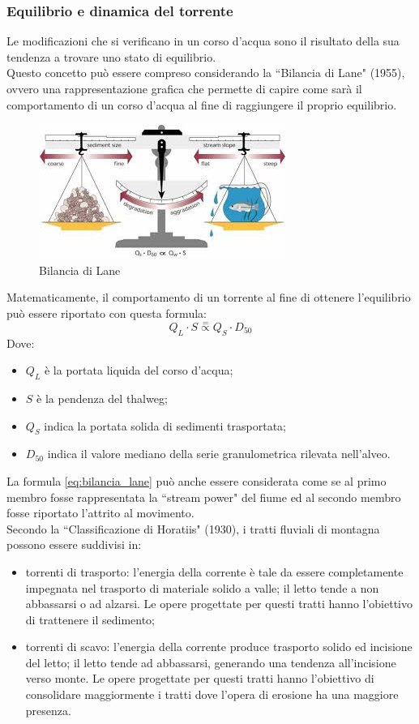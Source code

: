 \subsubsection{Equilibrio e dinamica del torrente}
Le modificazioni che si verificano in un corso d'acqua sono il risultato della sua tendenza a trovare uno stato di equilibrio.\\
Questo concetto può essere compreso considerando la ``Bilancia di Lane" (1955), ovvero una rappresentazione grafica che permette di capire come sarà il comportamento di un corso d'acqua al fine di raggiungere il proprio equilibrio.
\begin{figure}[H]  \centering
    \includegraphics[scale=1]{immagini/bilancia_lane.jpg}
    \caption{Bilancia di Lane}
    \label{bilancia_lane}
\end{figure}
Matematicamente, il comportamento di un torrente al fine di ottenere l'equilibrio può essere riportato con questa formula:
\begin{equation}
    Q_L \cdot S \overset{=}{\propto} Q_S \cdot D_{50}
    \label{eq:bilancia_lane}
\end{equation}
Dove:
\begin{itemize}
    \item $Q_L$ è la portata liquida del corso d'acqua;
    \item $S$ è la pendenza del thalweg;
    \item $Q_S$ indica la portata solida di sedimenti trasportata;
    \item $D_{50}$ indica il valore mediano della serie granulometrica rilevata nell'alveo.
\end{itemize}
La formula \eqref{eq:bilancia_lane} può anche essere considerata come se al primo membro fosse rappresentata la ``stream power" del fiume ed al secondo membro fosse riportato l'attrito al movimento.\\
Secondo la ``Classificazione di Horatiis" (1930), i tratti fluviali di montagna possono essere suddivisi in:
\begin{itemize}
    \item torrenti di trasporto: l'energia della corrente è tale da essere completamente impegnata nel trasporto di materiale solido a valle; il letto tende a non abbassarsi o ad alzarsi. Le opere progettate per questi tratti hanno l'obiettivo di trattenere il sedimento;
    \item torrenti di scavo: l'energia della corrente produce trasporto solido ed incisione del letto; il letto tende ad abbassarsi, generando una tendenza all'incisione verso monte. Le opere progettate per questi tratti hanno l'obiettivo di consolidare maggiormente i tratti dove l'opera di erosione ha una maggiore presenza.
\end{itemize}


